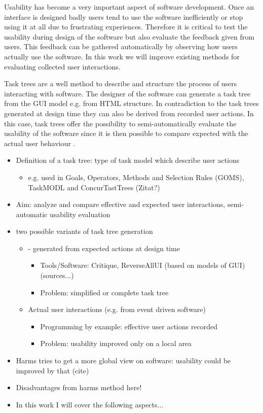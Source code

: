 Usability has become a very important aspect of software development. 
Once an interface is designed badly users tend to use the software inefficiently or stop using it at all due to frustrating experiences.
Therefore it is critical to test the usability during design of the software but also evaluate the feedback given from users. 
This feedback can be gathered automatically by observing how users actually use the software.
In this work we will improve existing methods for evaluating collected user interactions.

Task trees are a well method to describe and structure the process of users interacting with software. 
The designer of the software can generate a task tree from the GUI model e.g. from HTML structure. 
In contradiction to the task trees generated at design time they can also be derived from recorded user actions. 
In this case, task trees offer the possibility to semi-automatically evaluate the usability of the software since it is then possible to compare expected with the actual user behaviour \citep{harms2013}.  

\begin{itemize}
	\item Definition of a task tree: type of task model which describe user actions
    	\begin{itemize}
		\item  e.g. used in Goals, Operators, Methods and Selection Rules (GOMS), TaskMODL and ConcurTastTrees (Zitat?)
	\end{itemize}
	\item Aim: analyze and compare effective and expected user interactions, semi-automatic usability evaluation
	\item two possible variants of task tree generation 
 	\begin{itemize}
		\item - generated from expected actions at design time
      		\begin{itemize}
			\item Tools/Software: Critique, ReverseAllUI (based on models of GUI) (sources...)
     			\item Problem: simplified or complete task tree
		\end{itemize}
		\item Actual user interactions (e.g. from event driven software)
     		\begin{itemize} 
			\item Programming by example: effective user actions recorded
			\item Problem: usability improved only on a local area
		\end{itemize}
	\end{itemize}
	\item Harms tries to get a more global view on software: usability could be improved by that (cite) 
	\item Disadvantages from harms method here!
	\item In this work I will cover the following aspects...
\end{itemize}


